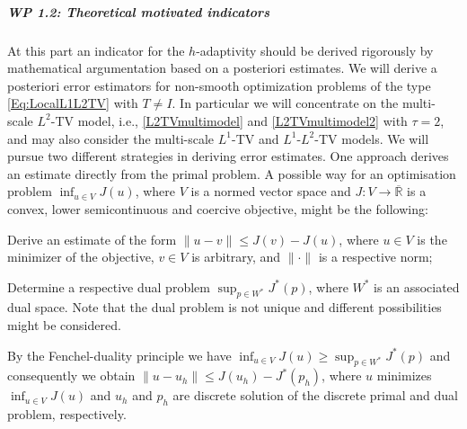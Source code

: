 \documentclass[enabledeprecatedfontcommands,cleardoublepage=empty,headsepline,twoside,11pt,DIV=15,BCOR=12mm,final]{scrartcl}
\newcommand{\R}{{\mathbb R}}
\begin{document}
 
 
 
 \subparagraph{WP 1.2: Theoretical motivated indicators}
 
  At this part an indicator for the $h$-adaptivity should be derived rigorously by mathematical argumentation based on a posteriori estimates. We will derive a posteriori error estimators for non-smooth optimization problems of the type \eqref{Eq:LocalL1L2TV} with $T\not= I$. In particular we will concentrate on the multi-scale $L^2$-TV model, i.e., \eqref{L2TVmultimodel} and \eqref{L2TVmultimodel2} with $\tau=2$, and may also consider the multi-scale $L^1$-TV and $L^1$-$L^2$-TV models. We will pursue two different strategies in deriving error estimates. One approach derives an estimate directly from the primal problem. A possible way for an optimisation problem $\inf_{u\in V} J(u)$, where $V$ is a normed vector space and $J: V \to \overline{\R}$ is a convex, lower semicontinuous and coercive objective, might be the following: 
\begin{inparaenum}[(i)]
\item Derive an estimate of the form $\|u -v \| \leq J(v) - J(u)$, where $u\in V$ is the minimizer of the objective, $v\in V$ is arbitrary, and $\|\cdot\|$ is a respective norm;
\item Determine a respective dual problem $\sup_{p\in W^*} J^*(p)$, where $W^*$ is an associated dual space. Note that the dual problem is not unique and different possibilities might be considered. %
\item  By the Fenchel-duality principle we have $\inf_{u\in V} J(u)\geq \sup_{p\in W^*} J^*(p)$ and consequently we obtain $\|u -u_h \| \leq J(u_h) - J^*(p_h)$, where $u$ minimizes  $\inf_{u\in V} J(u)$ and $u_h$ and $p_h$ are discrete solution of the discrete primal and dual problem, respectively. 
\end{inparaenum} 
\end{document}
